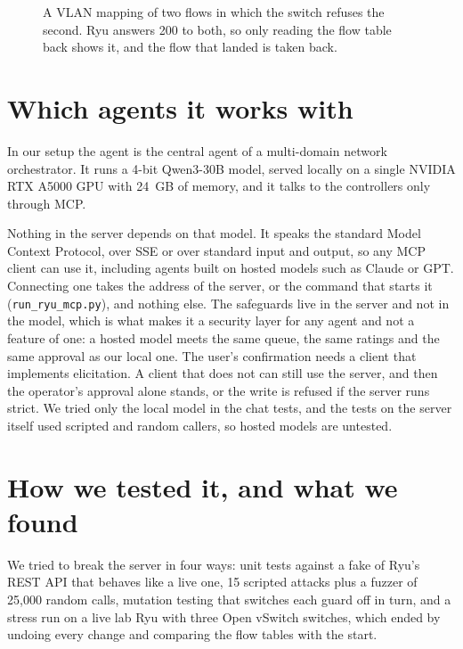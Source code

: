 \documentclass[10pt,letterpaper]{article}
\begin{document}
\begin{figure}[t]
{}
\caption{A VLAN mapping of two flows in which the switch refuses the second. Ryu answers 200 to both, so only reading the flow table back shows it, and the flow that landed is taken back.}
\label{fig:seq}
\end{figure}

\section*{Which agents it works with}

In our setup the agent is the central agent of a multi-domain network orchestrator. It runs a 4-bit Qwen3-30B model, served locally on a single NVIDIA RTX A5000 GPU with 24~GB of memory, and it talks to the controllers only through MCP.

Nothing in the server depends on that model. It speaks the standard Model Context Protocol, over SSE or over standard input and output, so any MCP client can use it, including agents built on hosted models such as Claude or GPT. Connecting one takes the address of the server, or the command that starts it (\texttt{run\_ryu\_mcp.py}), and nothing else. The safeguards live in the server and not in the model, which is what makes it a security layer for any agent and not a feature of one: a hosted model meets the same queue, the same ratings and the same approval as our local one. The user's confirmation needs a client that implements elicitation. A client that does not can still use the server, and then the operator's approval alone stands, or the write is refused if the server runs strict. We tried only the local model in the chat tests, and the tests on the server itself used scripted and random callers, so hosted models are untested.

\section*{How we tested it, and what we found}

We tried to break the server in four ways: unit tests against a fake of Ryu's REST API that behaves like a live one, 15 scripted attacks plus a fuzzer of 25,000 random calls, mutation testing that switches each guard off in turn, and a stress run on a live lab Ryu with three Open vSwitch switches, which ended by undoing every change and comparing the flow tables with the start.
\end{document}
